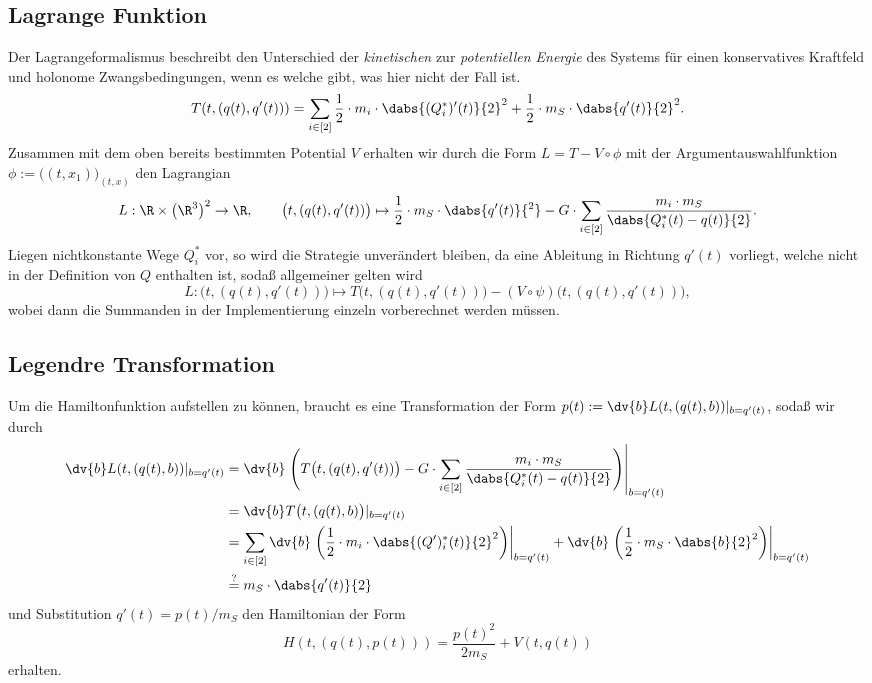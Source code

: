 \documentclass{subfiles}
\begin{document}
    \subsection*{Lagrange Funktion}
        Der Lagrangeformalismus beschreibt den Unterschied der \emph{kinetischen} zur \emph{potentiellen Energie} des Systems für einen konservatives Kraftfeld und holonome Zwangsbedingungen, wenn es welche gibt, was hier nicht der Fall ist.
        \[
            T(t,(q(t),q'(t))) = \sum_{i\in[2]}\frac12\cdot m_i\cdot\dabs{(Q_i^*)'(t)}{2}^2 + \frac12\cdot m_S\cdot\dabs{q'(t)}{2}^2.
        \]
        Zusammen mit dem oben bereits bestimmten Potential $V$ erhalten wir durch die Form $L = T - V\circ\phi$ mit der Argumentauswahlfunktion $\phi:=\bigl((t,x_1)\bigr)_{(t,x)}$ den Lagrangian
        \[
            L:\R\times\bigl(\R^3\bigr)^2\to\R,\qquad \bigl(t,(q(t),q'(t))\bigr)\mapsto \frac12\cdot m_S\cdot\dabs{q'(t)}{^2} - G\cdot\sum_{i\in[2]}\frac{m_i\cdot m_S}{\dabs{Q_i^*(t) - q(t)}{2}}.
        \]
        Liegen nichtkonstante Wege $Q_i^*$ vor, so wird die Strategie unverändert bleiben, da eine Ableitung in Richtung $q'(t)$ vorliegt, welche nicht in der Definition von $Q$ enthalten ist, sodaß allgemeiner gelten wird
        \[
            L:\bigl(t,(q(t),q'(t))\bigr)\mapsto T\bigl(t,(q(t),q'(t))\bigr) - (V\circ\psi)\bigl(t,(q(t),q'(t))\bigr),
        \]
        wobei dann die Summanden in der Implementierung einzeln vorberechnet werden müssen.
        

    \subsection*{Legendre Transformation}
        Um die Hamiltonfunktion aufstellen zu können, braucht es eine Transformation der Form $p(t):=\dv{b}L(t,(q(t),b))|_{b=q'(t)}$, sodaß wir durch 
        \begin{align*}
            \dv{b}L(t,(q(t),b))|_{b=q'(t)} &= \dv{b}\left.\Biggl(
                T\bigl(t,(q(t),q'(t))\bigr) - G\cdot\sum_{i\in[2]}\frac{m_i\cdot m_S}{\dabs{Q_i^*(t) - q(t)}{2}}    
            \Biggr)\right|_{b=q'(t)} \\
            &= \dv{b}T\bigl(t,(q(t),b)\bigr)|_{b=q'(t)} \\
            &= \sum_{i\in[2]}\dv{b}\left.\biggl(\frac12\cdot m_i\cdot\dabs{(Q')_i^*(t)}{2}^2\biggr)\right|_{b=q'(t)} + \dv{b}\left.\biggl(\frac12\cdot m_S\cdot\dabs{b}{2}^2\biggr)\right|_{b=q'(t)} \\
            &\stackrel{?}{=}m_S\cdot \dabs{q'(t)}{2}
        \end{align*}
        und Substitution $q'(t) = p(t) / m_S$ den Hamiltonian der Form 
        \[
            H(t,(q(t),p(t))) = \frac{p(t)^2}{2m_S} + V(t,q(t))
        \]
        erhalten. 
\end{document}
